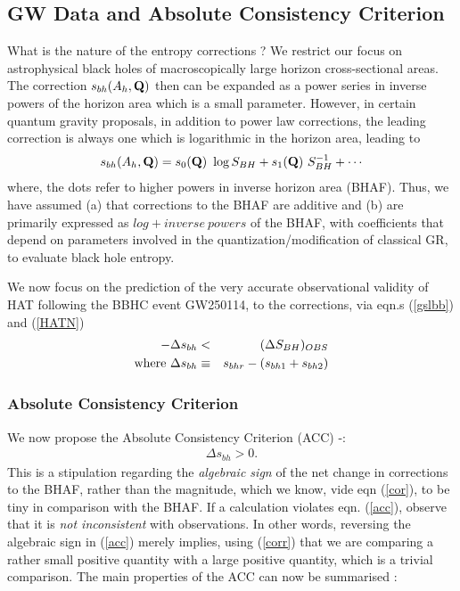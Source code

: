 \documentclass[11pt]{article}
\begin{document}
\subsection{GW Data and Absolute Consistency Criterion}

What is the nature of the entropy corrections ? We restrict our focus on astrophysical black holes of macroscopically large horizon cross-sectional areas. The correction $s_{bh}(A_h, {\bf Q})$ then can be expanded as a power series in inverse powers of the horizon area which is a small parameter. However, in certain quantum gravity proposals, in addition to power law corrections, the leading correction is always one which is logarithmic in the horizon area, leading to 
\begin{eqnarray}
s_{bh}(A_h, {\bf Q}) = s_0({\bf Q}) ~\log S_{BH} + s_1({\bf Q}) ~S_{BH}^{-1} + \cdots \label{corr}
\end{eqnarray}
where, the dots refer to higher powers in inverse horizon area (BHAF). Thus, we have assumed (a) that corrections to the BHAF are additive and (b) are primarily expressed as $log + inverse~ powers$ of the BHAF, with coefficients that depend on parameters involved in the quantization/modification of classical GR, to evaluate black hole entropy.

We now focus on the prediction of the very accurate observational validity of HAT following the BBHC event GW250114, to the corrections, via eqn.s (\ref{gslbb}) and (\ref{HATN}) 
\begin{eqnarray}
-\Delta s_{bh} & < &   (\Delta S_{BH})_{OBS} \nonumber \\
{\rm where}~ \Delta s_{bh} & \equiv & s_{bhr} - (s_{bh1} + s_{bh2})
\end{eqnarray}

\subsubsection{Absolute Consistency Criterion}

We now propose the Absolute Consistency Criterion (ACC) \cite{pm2025}-\cite{pm2026}:
\begin{eqnarray}
\Delta s_{bh} > 0. \label{acc}
\end{eqnarray}
This is a stipulation regarding the {\it algebraic sign} of the net change in corrections to the BHAF, rather than the magnitude, which we know, vide eqn (\ref{cor}), to be tiny in comparison with the BHAF. If a calculation violates eqn. (\ref{acc}), observe that it is {\it not inconsistent} with observations. In other words, reversing the algebraic sign in (\ref{acc}) merely implies, using (\ref{corr}) that we are comparing a rather small positive quantity with a large positive quantity, which is a trivial comparison. The main properties of the ACC can now be summarised :
\end{document}
